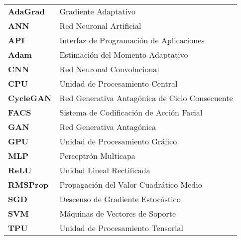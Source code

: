 \thispagestyle{plain}

\begin{glossary}

\begin{tabular}{l l}
    \\
    \textbf{AdaGrad} & Gradiente Adaptativo \\
    \textbf{ANN} & Red Neuronal Artificial \\
    \textbf{API} & Interfaz de Programación de Aplicaciones \\
    \textbf{Adam} & Estimación del Momento Adaptativo \\
    \textbf{CNN} & Red Neuronal Convolucional \\
    \textbf{CPU} & Unidad de Procesamiento Central \\
    \textbf{CycleGAN} & Red Generativa Antagónica de Ciclo Consecuente \\
    \textbf{FACS} & Sistema de Codificación de Acción Facial \\
    \textbf{GAN} & Red Generativa Antagónica \\
    \textbf{GPU} & Unidad de Procesamiento Gráfico \\
    \textbf{MLP} & Perceptrón Multicapa \\
    \textbf{ReLU} & Unidad Lineal Rectificada \\
    \textbf{RMSProp} & Propagación del Valor Cuadrático Medio \\
    \textbf{SGD} & Descenso de Gradiente Estocástico \\
    \textbf{SVM} & Máquinas de Vectores de Soporte \\
    \textbf{TPU} & Unidad de Procesamiento Tensorial \\

\end{tabular}

\end{glossary}

